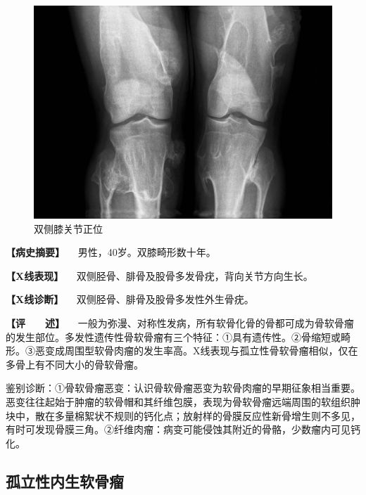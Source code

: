 \begin{figure}[!htbp]
 \centering
 \includegraphics{./images/Image00088.jpg}
 \captionsetup{justification=centering}
 \caption{双侧膝关节正位}
 \label{fig2-7-3}
  \end{figure} 

\textbf{【病史摘要】} 　男性，40岁。双膝畸形数十年。

\textbf{【X线表现】} 　双侧胫骨、腓骨及股骨多发骨疣，背向关节方向生长。

\textbf{【X线诊断】} 　双侧胫骨、腓骨及股骨多发性外生骨疣。

\textbf{【评　　述】}
　一般为弥漫、对称性发病，所有软骨化骨的骨都可成为骨软骨瘤的发生部位。多发性遗传性骨软骨瘤有三个特征：①具有遗传性。②骨缩短或畸形。③恶变成周围型软骨肉瘤的发生率高。X线表现与孤立性骨软骨瘤相似，仅在多骨上有不同大小的骨软骨瘤。

鉴别诊断：①骨软骨瘤恶变：认识骨软骨瘤恶变为软骨肉瘤的早期征象相当重要。恶变往往起始于肿瘤的软骨帽和其纤维包膜，表现为骨软骨瘤远端周围的软组织肿块中，散在多量棉絮状不规则的钙化点；放射样的骨膜反应性新骨增生则不多见，有时可发现骨膜三角。②纤维肉瘤：病变可能侵蚀其附近的骨骼，少数瘤内可见钙化。

\subsection{孤立性内生软骨瘤}

